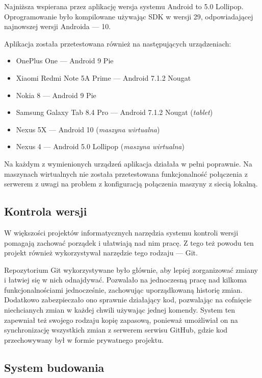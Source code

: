 \documentclass[polish,polish,a4paper,12pt]{article}
\begin{document}
	Najniższa wspierana przez aplikację wersja systemu Android to 5.0 Lollipop. Oprogramowanie było kompilowane używając SDK w wersji 29, odpowiadającej najnowszej wersji Androida — 10.

	Aplikacja została przetestowana również na następujących urządzeniach:

	\begin{itemize}
		\item OnePlus One — Android 9 Pie
		\item Xiaomi Redmi Note 5A Prime — Android 7.1.2 Nougat
		\item Nokia 8 — Android 9 Pie
		\item Samsung Galaxy Tab 8.4 Pro — Android 7.1.2 Nougat (\textit{tablet})
		\item Nexus 5X — Android 10 (\textit{maszyna wirtualna})
		\item Nexus 4 — Android 5.0 Lollipop (\textit{maszyna wirtualna})
	\end{itemize}

	Na każdym z wymienionych urządzeń aplikacja działała w pełni poprawnie. Na maszynach wirtualnych nie została przetestowana funkcjonalność połączenia z serwerem z uwagi na problem z konfiguracją połączenia maszyny z siecią lokalną.

	\subsection{Kontrola wersji}

	W większości projektów informatycznych narzędzia systemu kontroli wersji pomagają zachować porządek i ułatwiają nad nim pracę. Z tego też powodu ten projekt również wykorzystywał narzędzie tego rodzaju — Git.

	Repozytorium Git wykorzystywane było głównie, aby lepiej zorganizować zmiany i łatwiej się w nich odnajdywać. Pozwalało na jednoczesną pracę nad kilkoma funkcjonalnościami jednocześnie, zachowując uporządkowaną historię zmian. Dodatkowo zabezpieczało ono sprawnie działający kod, pozwalając na cofnięcie niechcianych zmian w każdej chwili używając jednej komendy. System ten zapewniał też swojego rodzaju kopię zapasową, ponieważ umożliwiał on na synchronizację wszystkich zmian z serwerem serwisu GitHub, gdzie kod przechowywany był w formie prywatnego projektu.

	\subsection{System budowania}
\end{document}
